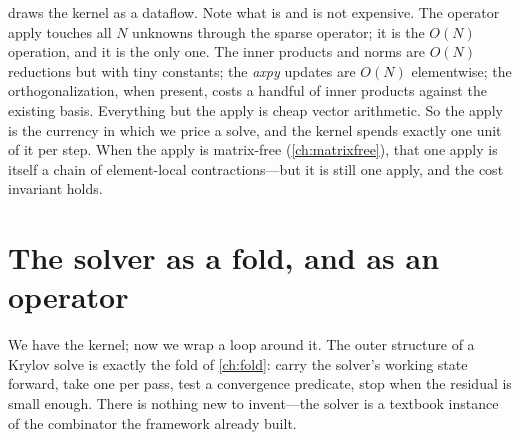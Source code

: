  draws the kernel as a dataflow. Note what is and is not
expensive. The operator apply touches all $N$ unknowns through the sparse operator;
it is the $O(N)$ operation, and it is the only one. The inner products and norms are
$O(N)$ reductions but with tiny constants; the \emph{axpy} updates are $O(N)$
elementwise; the orthogonalization, when present, costs a handful of inner products
against the existing basis. Everything but the apply is cheap vector arithmetic. So
the apply is the currency in which we price a solve, and the kernel spends exactly
one unit of it per step. When the apply is matrix-free (\cref{ch:matrixfree}), that
one apply is itself a chain of element-local contractions---but it is still one
apply, and the cost invariant holds.

\section{The solver as a fold, and as an operator}
\label{sec:krylov-fold}

We have the kernel; now we wrap a loop around it. The outer structure of a Krylov
solve is exactly the  fold of \cref{ch:fold}: carry the
solver's working state forward, take one  per pass, test a
convergence predicate, stop when the residual is small enough. There is nothing new
to invent---the solver is a textbook instance of the combinator the framework
already built.

